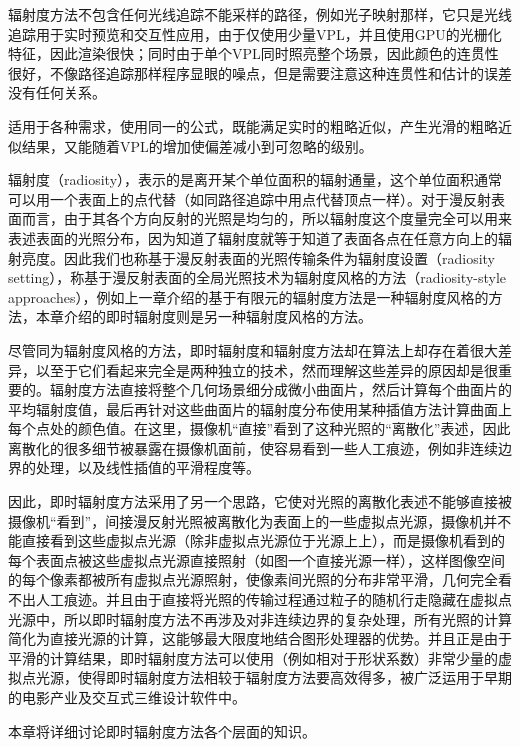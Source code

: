 辐射度方法不包含任何光线追踪不能采样的路径，例如光子映射那样，它只是光线追踪用于实时预览和交互性应用，由于仅使用少量VPL，并且使用GPU的光栅化特征，因此渲染很快；同时由于单个VPL同时照亮整个场景，因此颜色的连贯性很好，不像路径追踪那样程序显眼的噪点，但是需要注意这种连贯性和估计的误差没有任何关系。


适用于各种需求，使用同一的公式，既能满足实时的粗略近似，产生光滑的粗略近似结果，又能随着VPL的增加使偏差减小到可忽略的级别。



辐射度（radiosity），表示的是离开某个单位面积的辐射通量，这个单位面积通常可以用一个表面上的点代替（如同路径追踪中用点代替顶点一样）。对于漫反射表面而言，由于其各个方向反射的光照是均匀的，所以辐射度这个度量完全可以用来表述表面的光照分布，因为知道了辐射度就等于知道了表面各点在任意方向上的辐射亮度。因此我们也称基于漫反射表面的光照传输条件为辐射度设置（radiosity setting），称基于漫反射表面的全局光照技术为辐射度风格的方法（radiosity-style approaches），例如上一章介绍的基于有限元的辐射度方法是一种辐射度风格的方法，本章介绍的即时辐射度则是另一种辐射度风格的方法。

尽管同为辐射度风格的方法，即时辐射度和辐射度方法却在算法上却存在着很大差异，以至于它们看起来完全是两种独立的技术，然而理解这些差异的原因却是很重要的。辐射度方法直接将整个几何场景细分成微小曲面片，然后计算每个曲面片的平均辐射度值，最后再针对这些曲面片的辐射度分布使用某种插值方法计算曲面上每个点处的颜色值。在这里，摄像机“直接”看到了这种光照的“离散化”表述，因此离散化的很多细节被暴露在摄像机面前，使容易看到一些人工痕迹，例如非连续边界的处理，以及线性插值的平滑程度等。

因此，即时辐射度方法采用了另一个思路，它使对光照的离散化表述不能够直接被摄像机“看到”，间接漫反射光照被离散化为表面上的一些虚拟点光源，摄像机并不能直接看到这些虚拟点光源（除非虚拟点光源位于光源上上），而是摄像机看到的每个表面点被这些虚拟点光源直接照射（如图一个直接光源一样），这样图像空间的每个像素都被所有虚拟点光源照射，使像素间光照的分布非常平滑，几何完全看不出人工痕迹。并且由于直接将光照的传输过程通过粒子的随机行走隐藏在虚拟点光源中，所以即时辐射度方法不再涉及对非连续边界的复杂处理，所有光照的计算简化为直接光源的计算，这能够最大限度地结合图形处理器的优势。并且正是由于平滑的计算结果，即时辐射度方法可以使用（例如相对于形状系数）非常少量的虚拟点光源，使得即时辐射度方法相较于辐射度方法要高效得多，被广泛运用于早期的电影产业及交互式三维设计软件中。

本章将详细讨论即时辐射度方法各个层面的知识。



